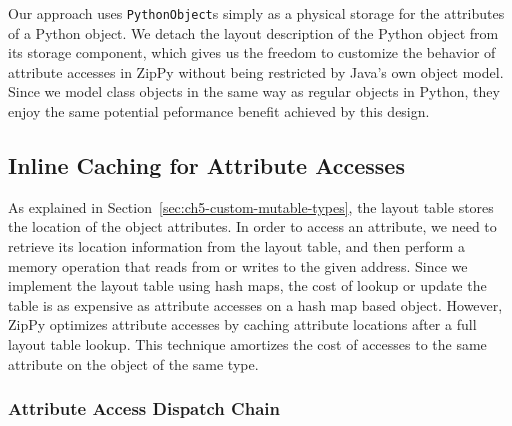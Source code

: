Our approach uses \texttt{PythonObject}s simply as a physical storage for the attributes of a Python object.
We detach the layout description of the Python object from its storage component, which gives us the freedom to customize the behavior of attribute accesses in ZipPy without being restricted by Java's own object model.
Since we model class objects in the same way as regular objects in Python, they enjoy the same potential peformance benefit achieved by this design.

\subsection{Inline Caching for Attribute Accesses}

As explained in Section~\ref{sec:ch5-custom-mutable-types}, the layout table stores the location of the object attributes.
In order to access an attribute, we need to retrieve its location information from the layout table, and then perform a memory operation that reads from or writes to the given address.
Since we implement the layout table using hash maps, the cost of lookup or update the table is as expensive as attribute accesses on a hash map based object.
However, ZipPy optimizes attribute accesses by caching attribute locations after a full layout table lookup.
This technique amortizes the cost of accesses to the same attribute on the object of the same type.

\subsubsection{Attribute Access Dispatch Chain}

